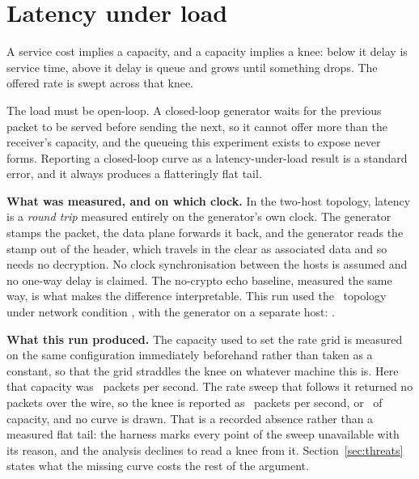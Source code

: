 \section{Latency under load}
\label{sec:latency}

A service cost implies a capacity, and a capacity implies a knee: below it delay
is service time, above it delay is queue and grows until something drops. The
offered rate is swept across that knee.

The load must be open-loop. A closed-loop generator waits for the previous
packet to be served before sending the next, so it cannot offer more than the
receiver's capacity, and the queueing this experiment exists to expose never
forms. Reporting a closed-loop curve as a latency-under-load result is a
standard error, and it always produces a flatteringly flat tail.

\noindent\textbf{What was measured, and on which clock.}
In the two-host topology, latency is a \emph{round trip} measured entirely on
the generator's own clock. The generator stamps the packet, the data plane
forwards it back, and the generator reads the stamp out of the header, which
travels in the clear as associated data and so needs no decryption. No clock
synchronisation between the hosts is assumed and no one-way delay is claimed.
The no-crypto echo baseline, measured the same way, is what makes the difference
interpretable. This run used the \latTopology\ topology under network condition
\latNetem, with the generator on a separate host: \latInterpretation.

\noindent\textbf{What this run produced.}
The capacity used to set the rate grid is measured on the same configuration
immediately beforehand rather than taken as a constant, so that the grid
straddles the knee on whatever machine this is. Here that capacity was
\latCapacityPPS\ packets per second. The rate sweep that follows it returned no
packets over the wire, so the knee is reported as \latKneePPS\ packets per
second, or \latKneeFraction\ of capacity, and no curve is drawn. That is a
recorded absence rather than a measured flat tail: the harness marks every point
of the sweep unavailable with its reason, and the analysis declines to read a
knee from it. Section~\ref{sec:threats} states what the missing curve costs the
rest of the argument.
